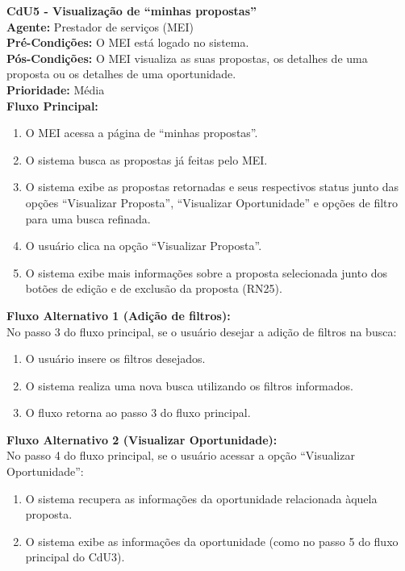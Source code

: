 \vspace{7pt}
\noindent\textbf{\normalsize CdU5 - Visualização de ``minhas propostas''}\\
\noindent\textbf{Agente:} Prestador de serviços (MEI)\\ 
\textbf{Pré-Condições:} O MEI está logado no sistema.\\ 
\textbf{Pós-Condições:} O MEI visualiza as suas propostas, os detalhes de uma proposta ou os detalhes de uma oportunidade.\\
\textbf{Prioridade:} Média \vspace{3pt}\\
\noindent\textbf{Fluxo Principal:}
\begin{enumerate}[noitemsep, topsep=-5pt, parsep=0pt]
    \item O MEI acessa a página de ``minhas propostas''.
    \item O sistema busca as propostas já feitas pelo MEI.
    \item O sistema exibe as propostas retornadas e seus respectivos status junto das opções ``Visualizar Proposta'', ``Visualizar Oportunidade'' e opções de filtro para uma busca refinada.
    \item O usuário clica na opção ``Visualizar Proposta''.
    \item O sistema exibe mais informações sobre a proposta selecionada junto dos botões de edição e de exclusão da proposta (RN25).
\end{enumerate}

\noindent\textbf{Fluxo Alternativo 1 (Adição de filtros):}\\
No passo 3 do fluxo principal, se o usuário desejar a adição de filtros na busca:
\begin{enumerate}[noitemsep, topsep=-5pt, parsep=0pt]
    \item O usuário insere os filtros desejados.
    \item O sistema realiza uma nova busca utilizando os filtros informados.
    \item O fluxo retorna ao passo 3 do fluxo principal.
\end{enumerate}

\noindent\textbf{Fluxo Alternativo 2 (Visualizar Oportunidade):}\\
No passo 4 do fluxo principal, se o usuário acessar a opção ``Visualizar Oportunidade'':
\begin{enumerate}[noitemsep, topsep=-5pt, parsep=0pt]
    \item O sistema recupera as informações da oportunidade relacionada àquela proposta.
    \item O sistema exibe as informações da oportunidade (como no passo 5 do fluxo principal do CdU3).
\end{enumerate}

